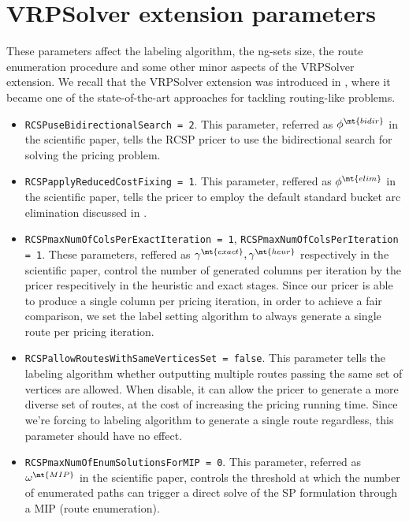 \section{VRPSolver extension parameters}

These parameters affect the labeling algorithm, the ng-sets size,
the route enumeration procedure and some other minor aspects of the VRPSolver extension.
We recall that the VRPSolver extension was introduced in \textcite{pessoa2020a},
where it became one of the state-of-the-art approaches for tackling routing-like problems.

\begin{itemize}
	\item \texttt{RCSPuseBidirectionalSearch = 2}.
	      This parameter, referred as $\phi^\mt{bidir}$ in the scientific paper,
	      tells the RCSP pricer to use the bidirectional search for solving the pricing problem.
	\item \texttt{RCSPapplyReducedCostFixing = 1}.
	      This parameter, reffered as $\phi^\mt{elim}$ in the scientific paper,
	      tells the pricer to employ the default standard bucket arc elimination discussed in \textcite{sadykov2021a}.
	\item \texttt{RCSPmaxNumOfColsPerExactIteration = 1}, \texttt{RCSPmaxNumOfColsPerIteration = 1}.
	      These parameters, reffered as $\gamma^\mt{exact}, \gamma^\mt{heur}$ respectively in the scientific paper,
	      control the number of generated columns per iteration by the pricer respecitively in the heuristic and exact stages.
	      Since our pricer is able to produce a single column per pricing iteration, in order to achieve a fair comparison,
	      we set the label setting algorithm to always generate a single route per pricing iteration.
	\item \texttt{RCSPallowRoutesWithSameVerticesSet = false}.
	      This parameter tells the labeling algorithm whether outputting multiple routes passing the same set of vertices are allowed.
	      When disable, it can allow the pricer to generate a more diverse set of routes, at the cost of increasing the pricing running time.
	      Since we're forcing to labeling algorithm to generate a single route regardless, this parameter should have no effect.
	\item \texttt{RCSPmaxNumOfEnumSolutionsForMIP = 0}.
	      This parameter, referred as $\omega^\mt{MIP}$ in the scientific paper,
	      controls the threshold at which the number of enumerated paths can trigger a direct solve of the SP formulation through a MIP (route enumeration).

\end{itemize}
